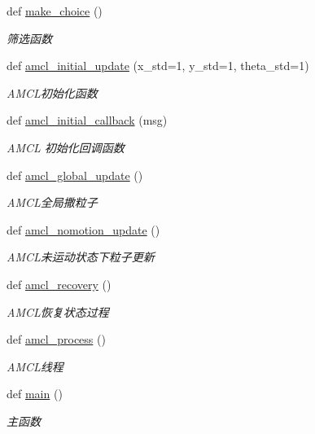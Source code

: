 \begin{DoxyCompactItemize}
def \hyperlink{namespaceselect___a__dox_a0a0029d6640915baf31f3cb76c0658ab}{make\+\_\+choice} ()
\begin{DoxyCompactList}\small\item\em 筛选函数 \end{DoxyCompactList}\item 
def \hyperlink{namespaceselect___a__dox_aaae6f4a3d568931c6038b1e3cbfb6f9a}{amcl\+\_\+initial\+\_\+update} (x\+\_\+std=1, y\+\_\+std=1, theta\+\_\+std=1)
\begin{DoxyCompactList}\small\item\em A\+M\+C\+L初始化函数 \end{DoxyCompactList}\item 
def \hyperlink{namespaceselect___a__dox_a843ff715ed42a01fc98f2199ea314cea}{amcl\+\_\+initial\+\_\+callback} (msg)
\begin{DoxyCompactList}\small\item\em A\+M\+CL 初始化回调函数 \end{DoxyCompactList}\item 
def \hyperlink{namespaceselect___a__dox_a4c38eb63cc34fdb7d60461a006f34100}{amcl\+\_\+global\+\_\+update} ()
\begin{DoxyCompactList}\small\item\em A\+M\+C\+L全局撒粒子 \end{DoxyCompactList}\item 
def \hyperlink{namespaceselect___a__dox_a1c4df087055bbe2cb5ce63c92a51d493}{amcl\+\_\+nomotion\+\_\+update} ()
\begin{DoxyCompactList}\small\item\em A\+M\+C\+L未运动状态下粒子更新 \end{DoxyCompactList}\item 
def \hyperlink{namespaceselect___a__dox_a37dfe6ff00e8834a1d53c1612354758c}{amcl\+\_\+recovery} ()
\begin{DoxyCompactList}\small\item\em A\+M\+C\+L恢复状态过程 \end{DoxyCompactList}\item 
def \hyperlink{namespaceselect___a__dox_afd73791153a71f1fcddb1b58d87fcf6e}{amcl\+\_\+process} ()
\begin{DoxyCompactList}\small\item\em A\+M\+C\+L线程 \end{DoxyCompactList}\item 
def \hyperlink{namespaceselect___a__dox_a3b1a91ee1ddc60fac7981f8cb5ea0368}{main} ()
\begin{DoxyCompactList}\small\item\em 主函数 \end{DoxyCompactList}\end{DoxyCompactItemize}
